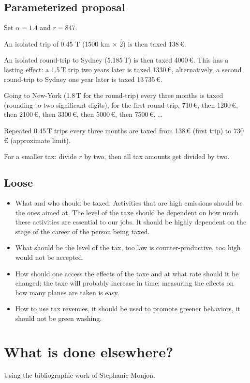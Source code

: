 \documentclass[version=3.21, pagesize, twoside=off, bibliography=totoc, DIV=calc, fontsize=12pt, a4paper, french, english]{scrartcl}
\begin{document}
\subsection{Parameterized proposal}
Set $α = 1.4$ and $r = 847$.

An isolated trip of 0.45 T (1500 km × 2)  is then taxed 138\,€.

An isolated round-trip to Sydney (5.185\,T) is then taxed 4000\,€. This has a lasting effect: a 1.5\,T trip two years later is taxed 1330\,€, alternatively, a second round-trip to Sydney one year later is taxed 13\,735\,€.

Going to New-York (1.8\,T for the round-trip) every three months is taxed (rounding to two significant digits), for the first round-trip, 710\,€, then 1200\,€, then 2100\,€, then 3300\,€, then 5000\,€, then 7500\,€, …

Repeated 0.45\,T trips every three months are taxed from 138\,€ (first trip) to 730\,€ (approximate limit).

For a smaller tax: divide $r$ by two, then all tax amounts get divided by two.

\subsection{Loose}
\begin{itemize}
\item What and who should be taxed. Activities that are high emissions should be the ones aimed at. The level of the taxe should be dependent on how much these activities are essential to our jobs. It should be highly dependent on the stage of the career of the person being taxed.
\item What should be the level of the tax, too law is counter-productive, too high would not be accepted.  
\item How should one access the effects of the taxe and at what rate should it be changed; the taxe will probably increase in time; measuring the effects on how many planes are taken is easy.  
\item How to use tax revenues, it should be used to promote greener behaviors, it should not be green washing. 
\end{itemize}

%

\appendix
\section{What is done elsewhere?} 
Using the bibliographic work of Stephanie Monjon. 
\end{document}
